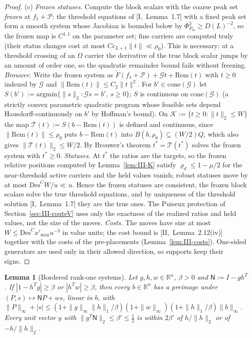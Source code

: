 \documentclass[10pt]{amsart}
\newtheorem{lemma}[theorem]{Lemma}
\theoremstyle{definition}
\theoremstyle{remark}
\newcommand{\R}{\mathbb R}
\begin{document}
\begin{proof}
(c) \emph{Frozen statuses.}  Compute the block scalars with the coarse peak set
\emph{frozen} at $f_1+\mathcal P$: the threshold equations of [I,~Lemma~1.7]
with a fixed peak set form a smooth system whose Jacobian is bounded below by
$\Phi_{P_m}^2\ge D(L)^{-2}$, so the frozen map is $C^{1,1}$ on the parameter set;
fine carriers are computed truly (their status changes cost at most
$Cc_{L+1}\|t\|\ll\rho_0$).  This is necessary: at a threshold crossing of an
$\Omega$ carrier the derivative of the true block scalar jumps by an amount of
order one, so the quadratic remainder bound fails without freezing.
\emph{Brouwer.}  Write the frozen system as $\tilde F(f_1+\mathcal P)+
\mathcal Gt+\mathrm{Rem}(t)$ with $t\ge0$ indexed by $\mathcal G$ and
$\|\mathrm{Rem}(t)\|\le C_2\|t\|^2$.  For $b'\in\mathrm{cone}(\mathcal G)$ let
$S(b'):=\mathrm{argmin}\{\|s\|_2:\mathcal Gs=b',\ s\ge0\}$; $S$ is continuous on
$\mathrm{cone}(\mathcal G)$ (a strictly convex parametric quadratic program whose
feasible sets depend Hausdorff-continuously on $b'$ by Hoffman's bound).  On
$\mathcal K:=\{t\ge0:\|t\|_2\le W\}$ the map $\mathcal T(t):=S(b-\mathrm{Rem}(t))$
is defined and continuous, since $\|\mathrm{Rem}(t)\|\le\rho_0$ puts
$b-\mathrm{Rem}(t)$ into $B(b,\rho_0)\subseteq(W/2)Q$, which also gives
$\|\mathcal T(t)\|_2\le W/2$.  By Brouwer's theorem $t^*=\mathcal T(t^*)$ solves
the frozen system with $t^*\ge0$.  \emph{Statuses.}  At $t^*$ the ratios are the
targets, so the frozen relative positions computed by Lemma~\ref{lem:III-K}
satisfy $\varrho_d\le1-\mu/2$ for the near-threshold active carriers and the
held values vanish; robust statuses move by at most $\mathrm{Des}^CW/u\ll u$.
Hence the frozen statuses are consistent, the frozen block scalars solve the
true threshold equations, and by uniqueness of the threshold solution
[I,~Lemma~1.7] they are the true ones.  The Puiseux protection of
Section~\ref{sec:III-routeV} uses only the exactness of the realized ratios and
held values, not the size of the moves.  \emph{Costs.}  The moves have size at
most $W\le\mathrm{Des}^Cx'_{\max}u^{-3}$ in value units; the cost bound is
[II,~Lemma~2.12(iv)] together with the costs of the pre-placements
(Lemma~\ref{lem:III-costs}).  One-sided generators are used only in their allowed
direction, so supports keep their signs.
\end{proof}

\begin{lemma}[Bordered rank-one systems]\label{lem:III-border}
Let $g,h,w\in\R^n$, $\beta>0$ and $\mathsf N:=I-gh^T$.  If $|1-h^Tg|\ge\beta$ or
$|h^Tw|\ge\beta$, then every $b\in\R^n$ has a preimage under $(P,s)\mapsto
\mathsf NP+ws$, linear in $b$, with $\|P\|_\infty+|s|\le(1+\|g\|_\infty
\|h\|_1/\beta)(1+\|w\|_\infty)(1+\|h\|_1/\beta)\|b\|_\infty$.  Every unit
vector $y$ with $\|y^T\mathsf N\|_2\le\beta'\le\frac12$ is within $2\beta'$ of
$h/\|h\|_2$ or of $-h/\|h\|_2$.
\end{lemma}
\end{document}
